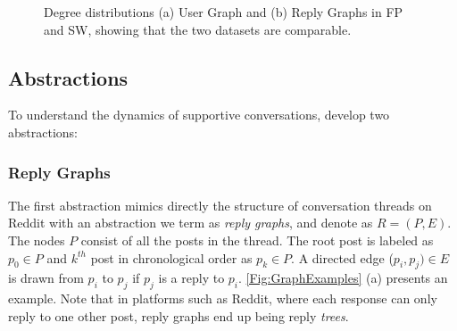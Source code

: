 \begin{figure}
    \centering
    \caption{Degree distributions  (a) User Graph and (b) Reply Graphs in FP and SW, showing that the two datasets are comparable.}
    \label{fig:degdist}
\end{figure}

\subsection{Abstractions} \label{sec:abstractions}
To understand the dynamics of supportive conversations, develop two abstractions: 
\subsubsection{Reply Graphs} \label{sec:reply_graphs}
The first abstraction mimics directly the structure of conversation threads on Reddit with an abstraction we term as \textit{reply graphs}, and denote as $R = (P,E)$. The nodes $P$ consist of all the posts in the thread. The root post is labeled as $p_0 \in P$ and $k^{th}$ post in chronological order as $p_k \in P$. A directed edge ($p_i,p_j) \in E$ is drawn from $p_i$ to $p_j$ if $p_j$ is a reply to $p_i$. \ref{Fig:GraphExamples} (a) presents an example. Note that in platforms such as Reddit, where each response can only reply to one other post, reply graphs end up being reply \textit{trees}.

